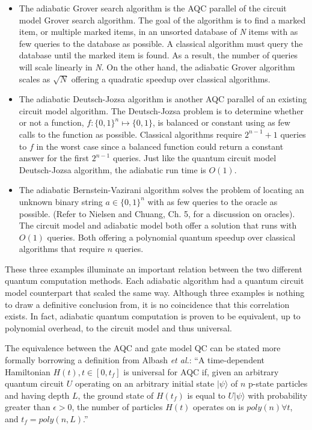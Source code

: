 \documentclass[%
 reprint,
 amsmath,amssymb,
 aps,
]{revtex4-1}
\begin{document}
   \begin{itemize}
   	\item The adiabatic Grover search algorithm is the AQC parallel of the circuit model Grover search algorithm. The goal of the algorithm is to find a marked item, or multiple marked items, in an unsorted database of \textit{N} items with as few queries to the database as possible. A classical algorithm must query the database until the marked item is found. As a result, the number of queries will scale linearly in \textit{N}. On the other hand, the adiabatic Grover algorithm scales as $\sqrt{N}$ offering a quadratic speedup over classical algorithms.
   \item The adiabatic Deutsch-Jozsa algorithm is another AQC parallel of an existing circuit model algorithm. The Deutsch-Jozsa problem is to determine whether or not a function, $f: \lbrace0,1\rbrace^n \longmapsto \lbrace0,1\rbrace$, is balanced or constant using as few calls to the function as possible. Classical algorithms require $2^{n-1} + 1$ queries to $f$ in the worst case since a balanced function could return a constant answer for the first $2^{n-1}$ queries. Just like the quantum circuit model Deutsch-Jozsa algorithm, the adiabatic run time is $O(1)$.
   \item The adiabatic Bernstein-Vazirani algorithm solves the problem of locating an unknown binary string $ a \in \lbrace0,1\rbrace^n  $ with as few queries to the oracle as possible. (Refer to Nielsen and Chuang, Ch. 5, for a discussion on oracles). The circuit model and adiabatic model both offer a solution that runs with $O(1)$ queries. Both offering a polynomial quantum speedup over classical algorithms that require $n$ queries.
   \end{itemize}
   
   These three examples illuminate an important relation between the two different quantum computation methods. Each adiabatic algorithm had a quantum circuit model counterpart that scaled the same way. Although three examples is nothing to draw a definitive conclusion from, it is no coincidence that this correlation exists. In fact, adiabatic quantum computation is proven to be equivalent, up to polynomial overhead, to the circuit model and thus universal\cite{Aharanov2007}. 
   
   The equivalence between the AQC and gate model QC can be stated more formally borrowing a definition from Albash \textit{et al.}: ``A time-dependent Hamiltonian $H(t), t\in [0,t_{f}]$ is universal for AQC if, given an arbitrary quantum circuit $U$ operating on an arbitrary initial state $\vert\psi\rangle$ of $n$ p-state particles and having depth $L$, the ground state of $H(t_f)$ is equal to $U\vert\psi\rangle$ with probability greater than $\epsilon>0$, the number of particles $H(t)$ operates on is $poly(n) \forall t$, and $t_f = poly(n,L)$.\cite{RevModPhys.90.015002}''
\end{document}
